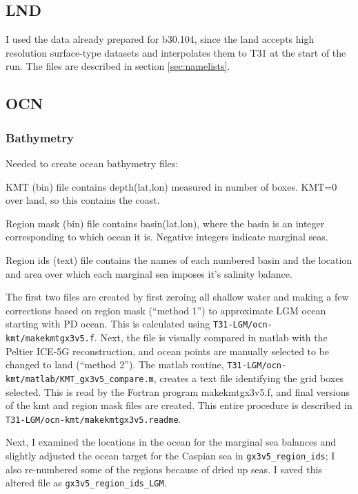 \documentclass[authoryear,round,12pt]{article}
\begin{document}
\subsection{LND}

I used the data already prepared for b30.104, since the land accepts
high resolution surface-type datasets and interpolates them to T31 at
the start of the run. The files are described in section
\ref{sec:namelists}.

\subsection{OCN}

\subsubsection{Bathymetry}

Needed to create ocean bathymetry files:

KMT (bin) file contains depth(lat,lon) measured in number of
boxes. KMT=0 over land, so this contains the coast.

Region mask (bin) file contains basin(lat,lon), where the basin is an
integer corresponding to which ocean it is. Negative integers indicate
marginal seas.

Region ids (text) file contains the names of each numbered basin and
the location and area over which each marginal sea imposes it's
salinity balance.

The first two files are created by first zeroing all shallow water and
making a few corrections based on region mask (``method 1'') to
approximate LGM ocean starting with PD ocean. This is calculated using
\verb+T31-LGM/ocn-kmt/makekmtgx3v5.f+. Next, the file is visually
compared in matlab with the Peltier ICE-5G reconstruction, and ocean
points are manually selected to be changed to land (``method 2''). The
matlab routine, \verb+T31-LGM/ocn-kmt/matlab/KMT_gx3v5_compare.m+,
creates a text file identifying the grid boxes selected. This is read
by the Fortran program makekmtgx3v5.f, and final versions of the kmt
and region mask files are created. This entire procedure is described in
\verb+T31-LGM/ocn-kmt/makekmtgx3v5.readme+.

Next, I examined the locations in the ocean for the marginal sea
balances and slightly adjusted the ocean target for the Caspian sea in
\verb+gx3v5_region_ids+; I also re-numbered some of the regions
because of dried up seas. I saved this altered file as
\verb+gx3v5_region_ids_LGM+.
\end{document}
